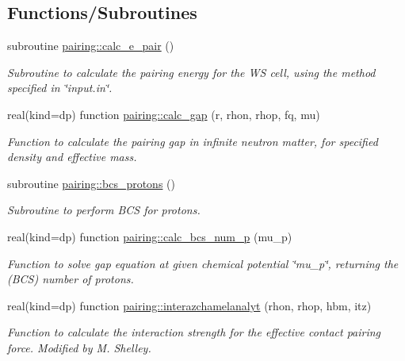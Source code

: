 \subsection*{Functions/\+Subroutines}
\begin{DoxyCompactItemize}
\item 
subroutine \mbox{\hyperlink{namespacepairing_ac34989a934af1e6a63131c619426c5aa}{pairing\+::calc\+\_\+e\+\_\+pair}} ()
\begin{DoxyCompactList}\small\item\em Subroutine to calculate the pairing energy for the WS cell, using the method specified in \char`\"{}input.\+in\char`\"{}. \end{DoxyCompactList}\item 
real(kind=dp) function \mbox{\hyperlink{namespacepairing_abad69eb8cb33077add1b9da84bff7c55}{pairing\+::calc\+\_\+gap}} (r, rhon, rhop, fq, mu)
\begin{DoxyCompactList}\small\item\em Function to calculate the pairing gap in infinite neutron matter, for specified density and effective mass. \end{DoxyCompactList}\item 
subroutine \mbox{\hyperlink{namespacepairing_a693cac2cfa7fcb7ad19984fefe20495c}{pairing\+::bcs\+\_\+protons}} ()
\begin{DoxyCompactList}\small\item\em Subroutine to perform B\+CS for protons. \end{DoxyCompactList}\item 
real(kind=dp) function \mbox{\hyperlink{namespacepairing_a37440fb2ff0d8a3495d051f3f14c9107}{pairing\+::calc\+\_\+bcs\+\_\+num\+\_\+p}} (mu\+\_\+p)
\begin{DoxyCompactList}\small\item\em Function to solve gap equation at given chemical potential \char`\"{}mu\+\_\+p\char`\"{}, returning the (B\+CS) number of protons. \end{DoxyCompactList}\item 
real(kind=dp) function \mbox{\hyperlink{namespacepairing_aebb21947c7228a3fb9a092edfa226662}{pairing\+::interazchamelanalyt}} (rhon, rhop, hbm, itz)
\begin{DoxyCompactList}\small\item\em Function to calculate the interaction strength for the effective contact pairing force. Modified by M. Shelley. \end{DoxyCompactList}\item 

\end{DoxyCompactItemize}
